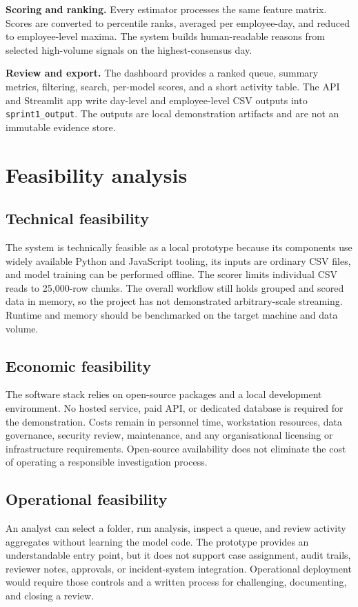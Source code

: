 \documentclass[12pt,a4paper,oneside]{report}
\newcommand{\code}[1]{\texttt{\small #1}}
\begin{document}
\textbf{Scoring and ranking.} Every estimator processes the same
feature matrix. Scores are converted to percentile ranks, averaged per
employee-day, and reduced to employee-level maxima. The system builds
human-readable reasons from selected high-volume signals on the
highest-consensus day.

\textbf{Review and export.} The dashboard provides a ranked queue,
summary metrics, filtering, search, per-model scores, and a short
activity table. The API and Streamlit app write day-level and
employee-level CSV outputs into \code{sprint1\_output}. The outputs are
local demonstration artifacts and are not an immutable evidence store.

\section{Feasibility analysis}

\subsection{Technical feasibility}
The system is technically feasible as a local prototype because its
components use widely available Python and JavaScript tooling, its
inputs are ordinary CSV files, and model training can be performed
offline. The scorer limits individual CSV reads to 25,000-row chunks.
The overall workflow still holds grouped and scored data in memory, so
the project has not demonstrated arbitrary-scale streaming. Runtime
and memory should be benchmarked on the target machine and data volume.

\subsection{Economic feasibility}
The software stack relies on open-source packages and a local
development environment. No hosted service, paid API, or dedicated
database is required for the demonstration. Costs remain in personnel
time, workstation resources, data governance, security review,
maintenance, and any organisational licensing or infrastructure
requirements. Open-source availability does not eliminate the cost of
operating a responsible investigation process.

\subsection{Operational feasibility}
An analyst can select a folder, run analysis, inspect a queue, and
review activity aggregates without learning the model code. The
prototype provides an understandable entry point, but it does not
support case assignment, audit trails, reviewer notes, approvals, or
incident-system integration. Operational deployment would require
those controls and a written process for challenging, documenting, and
closing a review.
\end{document}
